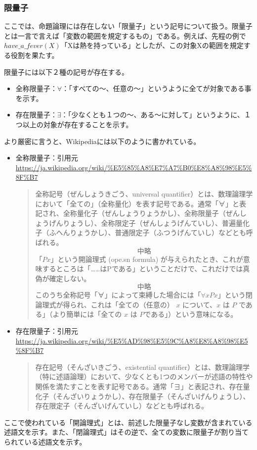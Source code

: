 \documentclass[dvipdfmx]{jsarticle}
\begin{document}
  \subsubsection{限量子}
ここでは、命題論理には存在しない「限量子」という記号について扱う。限量子とは一言で言えば「変数の範囲を規定するもの」である。例えば、先程の例で$have\_a\_fever(X)$「Xは熱を持っている」としたが、この対象Xの範囲を規定する役割を果たす。\par
限量子には以下２種の記号が存在する。
\begin{itemize}
  \item 全称限量子：$\forall$：「すべての〜、任意の〜」というように全てが対象である事を示す。
  \item 存在限量子：$\exists$：「少なくとも１つの〜、ある〜に対して」というように、１つ以上の対象が存在することを示す。
\end{itemize}
より厳密に言うと、Wikipediaには以下のように書かれている。
\begin{itemize}
  \item 全称限量子：引用元\url{https://ja.wikipedia.org/wiki/%E5%85%A8%E7%A7%B0%E8%A8%98%E5%8F%B7}
  \begin{quote}
    全称記号（ぜんしょうきごう、universal quantifier）とは、数理論理学において「全ての」（全称量化）を表す記号である。通常「∀」と表記され、全称量化子（ぜんしょうりょうかし）、全称限量子（ぜんしょうげんりょうし）、全称限定子（ぜんしょうげんていし）、普遍量化子（ふへんりょうかし）、普通限定子（ふつうげんていし）などとも呼ばれる。
    \[中略\]
    「$Px$」という開論理式 (ope.sn formula) が与えられたとき、これが意味するところは「……はPである」ということだけで、これだけでは真偽が確定しない。\[中略\]
    このうち全称記号「∀」によって束縛した場合には「$\forall x Px$」という閉論理式が得られ、これは「全ての（任意の） $x$ について、$x$ は $P$ である」（より簡単には「全ての $x$ は $P$である」）という意味になる。
  \end{quote}
  \item 存在限量子：引用元\url{https://ja.wikipedia.org/wiki/%E5%AD%98%E5%9C%A8%E8%A8%98%E5%8F%B7}
  \begin{quote}
    存在記号（そんざいきごう、existential quantifier）とは、数理論理学（特に述語論理）において、少なくとも1つのメンバーが述語の特性や関係を満たすことを表す記号である。通常「∃」と表記され、存在量化子（そんざいりょうかし）、存在限量子（そんざいげんりょうし）、存在限定子（そんざいげんていし）などとも呼ばれる。
  \end{quote}
\end{itemize}
ここで使われている「開論理式」とは、前述した限量子なし変数が含まれている述語文を示す。また、「閉論理式」はその逆で、全ての変数に限量子が割り当てられている述語文を示す。
\end{document}
